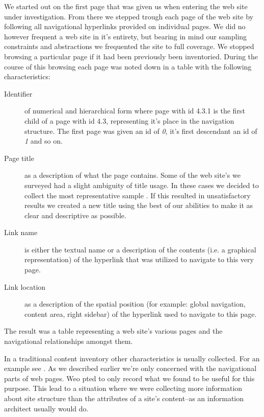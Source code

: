 We started out on the first page that was given us when entering the web site
under investigation. From there we stepped trough each page of the web site
by following all navigational hyperlinks provided on individual pages.
We did no however frequent a web site in it's entirety, but bearing in mind
our sampling constraints and abstractions we frequented the site to full
coverage. We stopped browsing a particular page if it%
had been previously been inventoried. During the course of this browsing
each page was noted down in a table with the following characteristics:

\begin{description}
  \item[Identifier] of numerical and hierarchical form where page with id
    4.3.1 is the first child of a page with id 4.3, representing it's place in
    the navigation structure. The first page was given an id of \emph{0}, it's
    first descendant an id of \emph{1} and so on.
  \item[Page title] as a description of what the page contains. Some of the
    web site's we surveyed had a slight ambiguity of title usage. In these
    cases we decided to collect the most representative sample%
    .
    If this resulted in unsatisfactory results we created a new title using
    the best of our abilities to make it as clear and descriptive as possible.
  \item[Link name] is either the textual name or a description of the
    contents (i.e. a graphical representation) of the hyperlink that was
    utilized to navigate to this very page.
  \item[Link location] as a description of the spatial position
    (for example: global navigation, content area, right sidebar) of the
    hyperlink used to navigate to this page.
\end{description}

The result was a table representing a web site's various pages and the
navigational relationships amongst them.

In a traditional content inventory other characteristics
is usually collected. For an example see \citet[p.~269]{wodtke02}.
As we described earlier we're only concerned with the navigational parts of
web pages. Weo pted to only record what we found to be useful for this
purpose. This lead to a situation where we were collecting more information
about site structure than the attributes of a site's content--as an
information architect usually would do.

